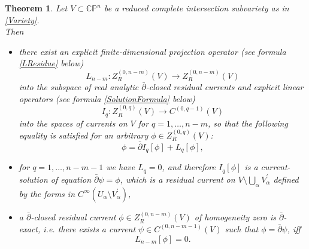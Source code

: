 \documentclass[11pt,reqno]{amsart}
\numberwithin{equation}{section}
\newtheorem{theorem}{Theorem}
\begin{document}
\begin{theorem}\label{HodgeRepresentation} Let $V\subset {{\mathbb C}}{{\mathbb P}}^n$ be a reduced complete
intersection subvariety as in \eqref{Variety}.\\
\indent
Then
\begin{itemize}
\item[(i)]
there exist an explicit finite-dimensional projection operator
(see formula \eqref{LResidue} below)
$$L_{n-m}: Z_R^{(0,n-m)}\left(V\right)\to Z_R^{(0,n-m)}\left(V\right)$$
into the subspace of real analytic $\bar\partial$-closed residual currents and explicit
linear operators (see formula \eqref{SolutionFormula} below)
$$I_q: Z_R^{(0,q)}\left(V\right)\to C^{(0,q-1)}\left(V\right)$$
into the spaces of currents on $V$
for $q=1,\dots,n-m$, so that the following equality is satisfied for an arbitrary
$\phi\in Z_R^{(0,q)}\left(V\right)$:
\begin{equation}\label{HodgeHomotopy}
\phi=\bar\partial I_q[\phi]+L_q[\phi],
\end{equation}
\item[(ii)]
for $q=1,\dots,n-m-1$ we have $L_q=0$, and therefore $I_q[\phi]$ is a current-solution
of equation $\bar\partial\psi=\phi$, which is a residual current on
$V\setminus \bigcup_{\alpha} V^{\prime}_{\alpha}$
defined by the forms in $C^{\infty}\left(U_{\alpha}\setminus V^{\prime}_{\alpha}\right)$,
\item[(iii)]
a $\bar\partial$-closed residual current $\phi\in Z_R^{(0,n-m)}\left(V\right)$
of homogeneity zero is $\bar\partial$-exact, i.e. there exists a current
$\psi\in C^{(0,n-m-1)}\left(V\right)$ such that $\phi=\bar\partial\psi$, iff
\begin{equation}\label{HodgeCondition}
L_{n-m}[\phi]=0.
\end{equation}
\end{itemize}
\end{theorem}
\end{document}
